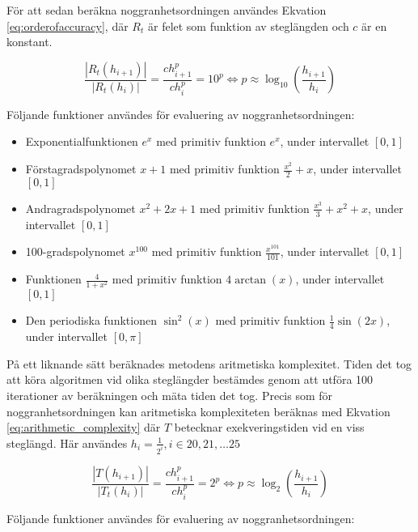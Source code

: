 \documentclass[a4paper,titlepage]{article}
\begin{document}
För att sedan beräkna noggranhetsordningen användes Ekvation
\ref{eq:orderofaccuracy}, där $R_t$
är felet som funktion av steglängden och $c$ är en konstant.

\begin{equation}
    \label{eq:orderofaccuracy}
    \frac{| R_t(h_{i+1})|}{| R_t(h_{i})|}  = \frac{ch_{i+1}^p}{ch_{i}^p} = 10^p
    \Leftrightarrow p \approx \log_{10}\left( \frac{h_{i+1}}{h_i} \right)
\end{equation}

Följande funktioner användes för evaluering av noggranhetsordningen:

\begin{itemize}
    \item Exponentialfunktionen $e^x$ med primitiv funktion $e^x$, under intervallet $[0, 1]$
    \item Förstagradspolynomet $x + 1$ med primitiv funktion $\frac{x^2}{2} + x$, under intervallet $[0, 1]$
    \item Andragradspolynomet $x^2 + 2x + 1$ med primitiv funktion
        $\frac{x^3}{3} + x^2 + x$, under intervallet $[0, 1]$
    \item 100-gradspolynomet $x^{100}$ med primitiv funktion
        $\frac{x^{101}}{101}$, under intervallet $[0, 1]$
    \item Funktionen $\frac{4}{1 + x^2}$ med primitiv funktion $4\arctan(x)$, under intervallet $[0, 1]$
    \item Den periodiska funktionen $\sin^2(x)$ med primitiv funktion
        $\frac{1}{4}\sin(2x)$, under intervallet $[0, \pi]$
\end{itemize}

På ett liknande sätt beräknades metodens aritmetiska komplexitet. Tiden det tog att köra
algoritmen vid olika steglängder bestämdes genom att utföra 100 iterationer av beräkningen
och mäta tiden det tog. Precis som för noggranhetsordningen kan aritmetiska komplexiteten
beräknas med Ekvation \ref{eq:arithmetic_complexity} där $T$ betecknar exekveringstiden
vid en viss steglängd. Här användes $h_i = \frac{1}{2^i}, i \in {20,21, \dots 25}$

\begin{equation}
    \label{eq:arithmetic_complexity}
    \frac{| T(h_{i+1})|}{| T_t(h_{i})|}  = \frac{ch_{i+1}^p}{ch_{i}^p} = 2^p
    \Leftrightarrow p \approx \log_{2}\left( \frac{h_{i+1}}{h_i} \right)
\end{equation}

Följande funktioner användes för evaluering av noggranhetsordningen:
\end{document}
